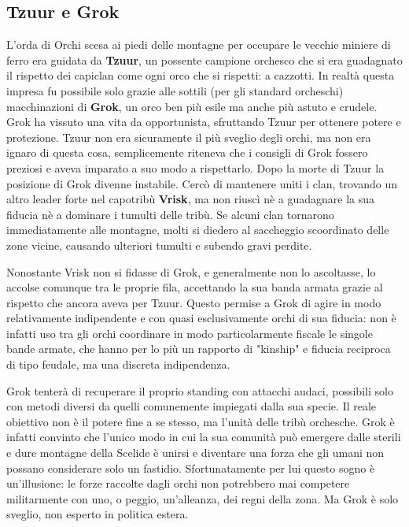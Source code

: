 \documentclass[10pt,twoside, twocolumn, openany]{dndbook}
\begin{document}
\subsection{Tzuur e Grok}
L'orda di Orchi scesa ai piedi delle montagne per occupare le vecchie miniere di ferro era guidata da \textbf{Tzuur}, un possente campione orchesco che si era guadagnato il rispetto dei capiclan come ogni orco che si rispetti: a cazzotti.
In realtà questa impresa fu possibile solo grazie alle sottili (per gli standard orcheschi) macchinazioni di \textbf{Grok}, un orco ben più esile ma anche più astuto e crudele. 
Grok ha vissuto una vita da opportunista, sfruttando Tzuur per ottenere potere e protezione. Tzuur non era sicuramente il più sveglio degli orchi, ma non era ignaro di questa cosa, semplicemente riteneva che i consigli di Grok fossero preziosi e aveva imparato a suo modo a rispettarlo.
Dopo la morte di Tzuur la posizione di Grok divenne instabile. Cercò di mantenere uniti i clan, trovando un altro leader forte nel capotribù \textbf{Vrisk}, ma non riuscì nè a guadagnare la sua fiducia nè a dominare i tumulti delle tribù.
Se alcuni clan tornarono immediatamente alle montagne, molti si diedero al saccheggio scoordinato delle zone vicine, causando ulteriori tumulti e subendo gravi perdite.

Nonostante Vrisk non si fidasse di Grok, e generalmente non lo ascoltasse, lo accolse comunque tra le proprie fila, accettando la sua banda armata grazie al rispetto che ancora aveva per Tzuur. 
Questo permise a Grok di agire in modo relativamente indipendente e con quasi esclusivamente orchi di sua fiducia: non è infatti uso tra gli orchi coordinare in modo particolarmente fiscale le singole bande armate, che hanno per lo più un rapporto di "kinship" e fiducia reciproca di tipo feudale, ma una discreta indipendenza.

Grok tenterà di recuperare il proprio standing con attacchi audaci, possibili solo con metodi diversi da quelli comunemente impiegati dalla sua specie. Il reale obiettivo non è il potere fine a se stesso, ma l'unità delle tribù orchesche.
Grok è infatti convinto che l'unico modo in cui la sua comunità può emergere dalle sterili e dure montagne della Scelide è unirsi e diventare una forza che gli umani non possano considerare solo un fastidio. 
Sfortunatamente per lui questo sogno è un'illusione: le forze raccolte dagli orchi non potrebbero mai competere militarmente con uno, o peggio, un'alleanza, dei regni della zona. Ma Grok è solo sveglio, non esperto in politica estera.
\end{document}
